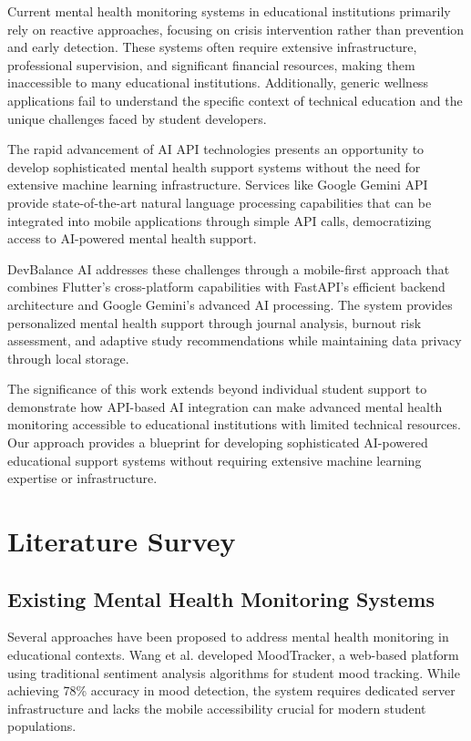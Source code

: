 \documentclass[conference,10pt]{IEEEtran}
\begin{document}
Current mental health monitoring systems in educational institutions primarily rely on reactive approaches, focusing on crisis intervention rather than prevention and early detection. These systems often require extensive infrastructure, professional supervision, and significant financial resources, making them inaccessible to many educational institutions. Additionally, generic wellness applications fail to understand the specific context of technical education and the unique challenges faced by student developers.

The rapid advancement of AI API technologies presents an opportunity to develop sophisticated mental health support systems without the need for extensive machine learning infrastructure. Services like Google Gemini API provide state-of-the-art natural language processing capabilities that can be integrated into mobile applications through simple API calls, democratizing access to AI-powered mental health support.

DevBalance AI addresses these challenges through a mobile-first approach that combines Flutter's cross-platform capabilities with FastAPI's efficient backend architecture and Google Gemini's advanced AI processing. The system provides personalized mental health support through journal analysis, burnout risk assessment, and adaptive study recommendations while maintaining data privacy through local storage.

The significance of this work extends beyond individual student support to demonstrate how API-based AI integration can make advanced mental health monitoring accessible to educational institutions with limited technical resources. Our approach provides a blueprint for developing sophisticated AI-powered educational support systems without requiring extensive machine learning expertise or infrastructure.

\section{Literature Survey}

\subsection{Existing Mental Health Monitoring Systems}

Several approaches have been proposed to address mental health monitoring in educational contexts. Wang et al. \cite{wang2020} developed MoodTracker, a web-based platform using traditional sentiment analysis algorithms for student mood tracking. While achieving 78\% accuracy in mood detection, the system requires dedicated server infrastructure and lacks the mobile accessibility crucial for modern student populations.
\end{document}
